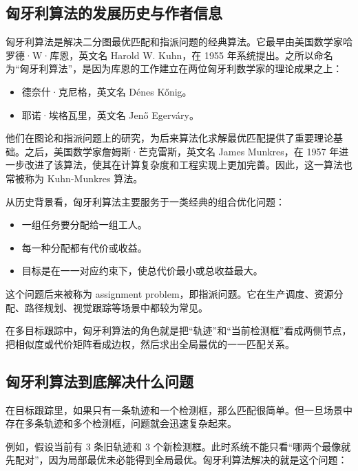 \subsection{匈牙利算法的发展历史与作者信息}\label{src-experiment-case2-h50}

匈牙利算法是解决二分图最优匹配和指派问题的经典算法。它最早由美国数学家哈罗德·W·库恩，英文名
Harold W. Kuhn，在 1955
年系统提出。之所以命名为``匈牙利算法''，是因为库恩的工作建立在两位匈牙利数学家的理论成果之上：

\begin{itemize}
\tightlist
\item
  德奈什·克尼格，英文名 Dénes Kőnig。
\item
  耶诺·埃格瓦里，英文名 Jenő Egerváry。
\end{itemize}

他们在图论和指派问题上的研究，为后来算法化求解最优匹配提供了重要理论基础。之后，美国数学家詹姆斯·芒克雷斯，英文名
James Munkres，在 1957
年进一步改进了该算法，使其在计算复杂度和工程实现上更加完善。因此，这一算法也常被称为
Kuhn-Munkres 算法。

从历史背景看，匈牙利算法主要服务于一类经典的组合优化问题：

\begin{itemize}
\tightlist
\item
  一组任务要分配给一组工人。
\item
  每一种分配都有代价或收益。
\item
  目标是在一一对应约束下，使总代价最小或总收益最大。
\end{itemize}

这个问题后来被称为 assignment
problem，即指派问题。它在生产调度、资源分配、路径规划、视觉跟踪等场景中都较为常见。

在多目标跟踪中，匈牙利算法的角色就是把``轨迹''和``当前检测框''看成两侧节点，把相似度或代价矩阵看成边权，然后求出全局最优的一一匹配关系。

\subsection{匈牙利算法到底解决什么问题}\label{src-experiment-case2-h51}

在目标跟踪里，如果只有一条轨迹和一个检测框，那么匹配很简单。但一旦场景中存在多条轨迹和多个检测框，问题就会迅速复杂起来。

例如，假设当前有 3 条旧轨迹和 3
个新检测框。此时系统不能只看``哪两个最像就先配对''，因为局部最优未必能得到全局最优。匈牙利算法解决的就是这个问题：

